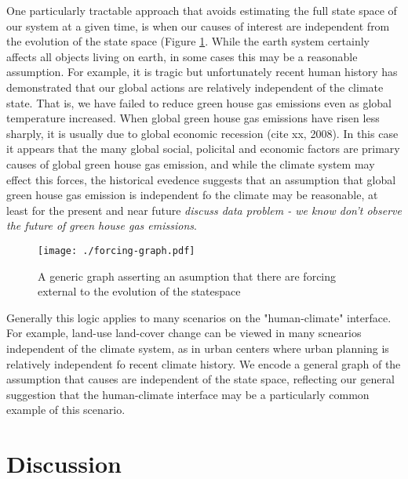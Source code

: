 \documentclass[12pt]{article}
\begin{document}
One particularly tractable approach that avoids estimating the full
state space of our system at a given time, is when our causes of
interest are independent from the evolution of the state space (Figure
\ref{fig:forcing}. While the earth system certainly affects all
objects living on earth, in some cases this may be a reasonable
assumption. For example, it is tragic but unfortunately recent human
history has demonstrated that our global actions are relatively
independent of the climate state. That is, we have failed to reduce
green house gas emissions even as global temperature increased. When
global green house gas emissions have risen less sharply, it is
usually due to global economic recession (cite xx, 2008). In this case
it appears that the many global social, policital and economic factors
are primary causes of global green house gas emission, and while the
climate system may effect this forces, the historical evedence
suggests that an assumption that global green house gas emission is
independent fo the climate may be reasonable, at least for the present
and near future \emph{discuss data problem - we know don't observe the
  future of green house gas emissions}.

\begin{figure}
  \texttt{[image: ./forcing-graph.pdf]}
  \caption{A generic graph asserting an asumption that there are
    forcing external to the evolution of the statespace}
  \label{fig:forcing}
\end{figure}



Generally this logic applies to many scenarios on the
"human-climate" interface. For example, land-use land-cover change
can be viewed in many scnearios independent of the climate system,
as in urban centers where urban planning is relatively independent
fo recent climate history. We encode a general graph of the
assumption that causes are independent of the state space,
reflecting our general suggestion that the human-climate interface
may be a particularly common example of this scenario.

\section{Discussion}
\end{document}
